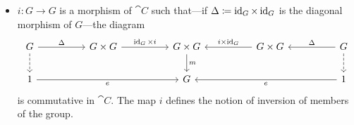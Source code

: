 \begin{definition}
\begin{itemize}
        \item \(i: G \to G\) is a morphism of \(\cat C\) such that---if \(\Delta
              \coloneq \operatorname{id}_G \times \operatorname{id}_G\) is the diagonal morphism of \(G\)---the diagram
              \[
                  \begin{tikzcd}
                      G \ar[rr, "\Delta"] \ar[d, dashed]
                      &
                      &G \times G \ar[rr, "\Id_G \times i"]
                      &
                      &G \times G \ar[d, "m"]
                      &
                      &G \times G \ar[ll, "i \times \Id_G"']
                      &
                      &G \ar[d, dashed] \ar[ll, "\Delta"']
                      \\
                      1 \ar[rrrr, "e"']
                      &
                      &
                      &
                      &G
                      &
                      &
                      &
                      &1 \ar[llll, "e"]
                  \end{tikzcd}
              \]
              is commutative in \(\cat C\). The map \(i\) defines the notion of inversion of
              members of the group.
    \end{itemize}
\end{definition}

